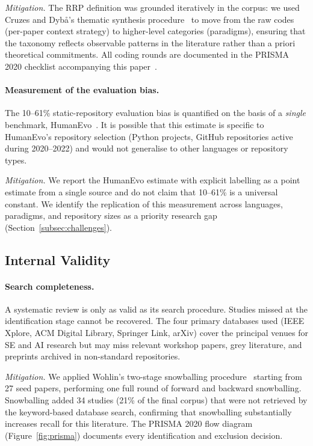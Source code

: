\emph{Mitigation.}
The RRP definition was grounded iteratively in the corpus: we used Cruzes and
Dyb{\aa}'s thematic synthesis procedure~\cite{cruzes2011recommended} to move
from the raw codes (per-paper context strategy) to higher-level categories
(paradigms), ensuring that the taxonomy reflects observable patterns in the
literature rather than a priori theoretical commitments.
All coding rounds are documented in the PRISMA 2020 checklist accompanying
this paper~\cite{page2021prisma}.

\paragraph{Measurement of the evaluation bias.}
The 10--61\% static-repository evaluation bias is quantified on the basis of a
\emph{single} benchmark, HumanEvo~\cite{zheng2025humanevo}.
It is possible that this estimate is specific to HumanEvo's repository
selection (Python projects, GitHub repositories active during 2020--2022) and
would not generalise to other languages or repository types.

\emph{Mitigation.}
We report the HumanEvo estimate with explicit labelling as a point estimate
from a single source and do not claim that 10--61\% is a universal constant.
We identify the replication of this measurement across languages, paradigms,
and repository sizes as a priority research gap
(Section~\ref{subsec:challenges}).

\subsection{Internal Validity}
\label{subsec:threat-internal}

\paragraph{Search completeness.}
A systematic review is only as valid as its search procedure.
Studies missed at the identification stage cannot be recovered.
The four primary databases used (IEEE Xplore, ACM Digital Library,
Springer Link, arXiv) cover the principal venues for SE and AI research
but may miss relevant workshop papers, grey literature, and
preprints archived in non-standard repositories.

\emph{Mitigation.}
We applied Wohlin's two-stage snowballing procedure~\cite{wohlin2014snowballing}
starting from 27 seed papers, performing one full round of forward and
backward snowballing.
Snowballing added 34 studies (21\% of the final corpus) that were not
retrieved by the keyword-based database search, confirming that snowballing
substantially increases recall for this literature.
The PRISMA 2020 flow diagram (Figure~\ref{fig:prisma}) documents every
identification and exclusion decision.

